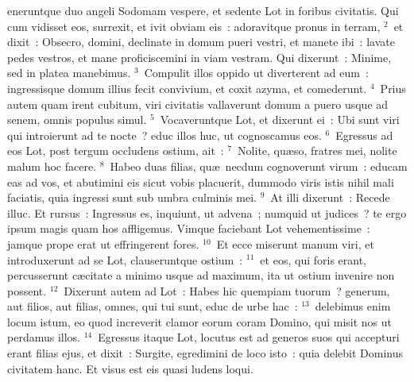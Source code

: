 \bchapter
{}eneruntque duo angeli Sodomam vespere, et sedente Lot in foribus civitatis. Qui cum vidisset eos, surrexit, et ivit obviam eis~: adoravitque pronus in terram,
${}^{2}$~et dixit~: Obsecro, domini, declinate in domum pueri vestri, et manete ibi~: lavate pedes vestros, et mane proficiscemini in viam vestram. Qui dixerunt~: Minime, sed in platea manebimus.
${}^{3}$~Compulit illos oppido ut diverterent ad eum~: ingressisque domum illius fecit convivium, et coxit azyma, et comederunt.
${}^{4}$~Prius autem quam irent cubitum, viri civitatis vallaverunt domum a puero usque ad senem, omnis populus simul.
${}^{5}$~Vocaveruntque Lot, et dixerunt ei~: Ubi sunt viri qui introierunt ad te nocte~? educ illos huc, ut cognoscamus eos.
${}^{6}$~Egressus ad eos Lot, post tergum occludens ostium, ait~:
${}^{7}$~Nolite, qu\ae so, fratres mei, nolite malum hoc facere.
${}^{8}$~Habeo duas filias, qu\ae\ necdum cognoverunt virum~: educam eas ad vos, et abutimini eis sicut vobis placuerit, dummodo viris istis nihil mali faciatis, quia ingressi sunt sub umbra culminis mei.
${}^{9}$~At illi dixerunt~: Recede illuc. Et rursus~: Ingressus es, inquiunt, ut advena~; numquid ut judices~? te ergo ipsum magis quam hos affligemus. Vimque faciebant Lot vehementissime~: jamque prope erat ut effringerent fores.
${}^{10}$~Et ecce miserunt manum viri, et introduxerunt ad se Lot, clauseruntque ostium~:
${}^{11}$~et eos, qui foris erant, percusserunt c\ae citate a minimo usque ad maximum, ita ut ostium invenire non possent.
${}^{12}$~Dixerunt autem ad Lot~: Habes hic quempiam tuorum~? generum, aut filios, aut filias, omnes, qui tui sunt, educ de urbe hac~:
${}^{13}$~delebimus enim locum istum, eo quod increverit clamor eorum coram Domino, qui misit nos ut perdamus illos.
${}^{14}$~Egressus itaque Lot, locutus est ad generos suos qui accepturi erant filias ejus, et dixit~: Surgite, egredimini de loco isto~: quia delebit Dominus civitatem hanc. Et visus est eis quasi ludens loqui.



